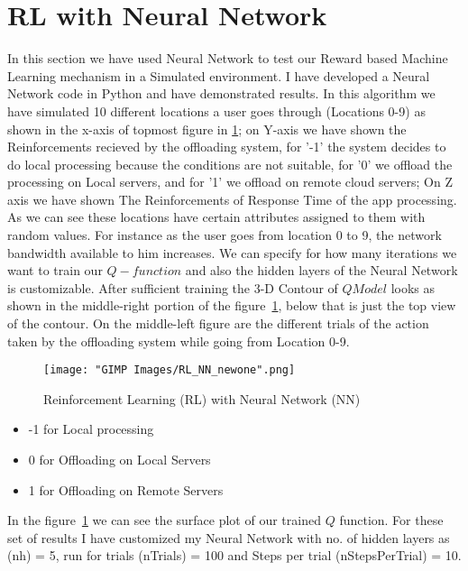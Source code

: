 \documentclass{report}
\begin{document}
\section{RL with Neural Network}
In this section we have used Neural Network to test our Reward based Machine Learning mechanism in a Simulated environment.
I have developed a Neural Network code in Python and have demonstrated results.
In this algorithm we have simulated 10 different locations a user goes through (Locations 0-9) as shown in the x-axis of topmost figure in \ref{fig:RL_NN}; on Y-axis we have shown the Reinforcements recieved by the offloading system, for '-1' the system decides to do local processing because the conditions are not suitable, for '0' we offload the processing on Local servers, and for '1' we offload on remote cloud servers; On Z axis we have shown The Reinforcements of Response Time of the app processing. As we can see these locations have certain attributes assigned to them with random values. For instance as the user goes from location 0 to 9, the network bandwidth available to him increases.
We can specify for how many iterations we want to train our $Q-function$ and also the hidden layers of the Neural Network is customizable. After sufficient training the 3-D Contour of $Q Model$ looks as shown in the middle-right portion of the figure~\ref{fig:RL_NN}, below that is just the top view of the contour. On the middle-left figure are the different trials of the action taken by the offloading system while going from Location 0-9.   

\begin{figure}[h!]
  \centering
  \texttt{[image: "GIMP Images/RL\_NN\_newone".png]}
  \caption{Reinforcement Learning (RL) with Neural Network (NN)}
  \label{fig:RL_NN}
\end{figure}


\begin{itemize}
   \item -1 for Local processing
   \item 0 for Offloading on Local Servers
   \item 1 for Offloading on Remote Servers
\end{itemize}      



In the figure~\ref{fig:RL_NN} we can see the surface plot of our trained $Q$ function. For these set of results I have customized my Neural Network with no. of hidden layers as (nh) = 5, run for trials (nTrials) = 100 and Steps per trial (nStepsPerTrial) = 10. \par
\end{document}
